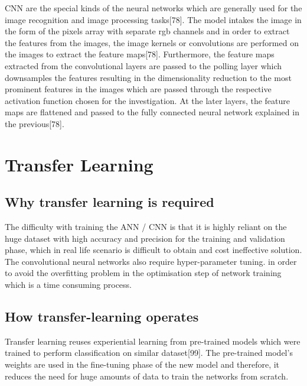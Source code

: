 CNN are the special kinds of the neural networks which are generally used for the image recognition and image processing tasks[78]. The model intakes the image in the form of the pixels array with separate rgb channels and in order to extract the features from the images, the image kernels or convolutions are performed on the images to extract the feature maps[78]. Furthermore, the feature maps extracted from the convolutional layers are passed to the polling layer which downsamples the features resulting in the dimensionality reduction to the most prominent features in the images which are passed through the respective activation function chosen for the investigation. At the later layers, the feature maps are flattened and passed to the fully connected neural network explained in the previous[78]. 

\section{Transfer Learning}

\subsection{Why transfer learning is required}
The difficulty with training the ANN / CNN is that it is highly reliant on the huge dataset with high accuracy and precision for the training and validation phase,
which in real life scenario is difficult to obtain and cost ineffective solution. The convolutional neural networks also require hyper-parameter tuning.
in order to avoid the overfitting problem in the optimisation step of network training which is a time consuming process\citep{seldon}. 

\subsection{ How transfer-learning operates}

Transfer learning reuses experiential learning from pre-trained models which were trained to 
perform classification on similar dataset[99]. The pre-trained model's weights are used in the fine-tuning phase of the new model 
and therefore, it reduces the need for huge amounts of data to train the networks from scratch\citep{seldon}. 